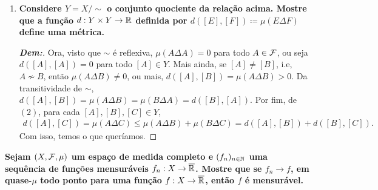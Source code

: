 \begin{enumerate}[label=(\alph*), wide, labelindent=0pt]
\begin{proof}[\textbf{Dem:}]
      \noindent 
      (Transitiva:) Sejam $A, B, C \in \mcal F$, vejamos que se $A\sim B$ e $B \sim C$, então $A \sim C$, ou seja,  
      $\mu (A\Delta C) = 0$. Note que, 
      \begin{align*}
        A\Delta C &= (A\cap C^C) \cup (C \cap A^C) = (A \cap C^C\cap(B \cup B^C)) \cup (C \cap A^C\cap(B \cup B^C))\\
        &=((A\cap C^C\cap B) \cup (A \cap C^C \cap B^C)) \cup ((C\cap A^C \cap B)\cup (C\cap A^C \cap B^C))\\
        &=((A\cap(B \setminus C))\cup(C^C\cap(A\setminus B)))\cup((C\cap(B\setminus A))\cup (A^C \cap (C \setminus B)))\\
        &\subseteq ((B\setminus C)\cup (A\setminus B))\cup ((B\setminus A) \cup (C\setminus B)) = (A\Delta B) \cup (B \Delta C).
      \end{align*}    
      Portanto, $\mu(A\Delta C) \le \mu((A\Delta B) \cup (B\Delta C)) $, $(2)$, ou seja 
      \begin{align*}
        0 \le \mu(A\Delta C) \le \mu((A\Delta B) \cup (B\Delta C)) \le \mu(A\Delta B) + \mu(B \Delta C) = 0 + 0 = 0,
      \end{align*}
      ou seja $\mu(A \Delta C) = 0$, isto é, $A \sim C$, como queríamos.
    \end{proof}
  \item \textbf{Considere $Y = X/\sim $ o conjunto quociente da 
    relação acima. Mostre que a função 
    $d: Y \times Y \rightarrow \mathbb R$ definida por 
    $d([E], [F])\coloneq \mu(E \Delta F)$ define uma métrica.}
    \begin{proof}[\textbf{Dem:}]
      Ora, visto que $\sim$ é reflexiva, $\mu(A \Delta A) = 0$ para todo $A \in \mathcal F$, ou seja $d([A], [A]) = 0$ para
      todo $[A] \in Y$. Mais ainda, se $[A] \neq [B]$, i.e, $A \not \sim B$, então $\mu(A\Delta B)\neq 0$, ou mais, 
      $d([A], [B]) = \mu(A \Delta B) > 0$. Da transitividade de $\sim$, $d([A], [B]) = \mu(A \Delta B) = 
      \mu(B \Delta A) = d([B], [A])$. Por fim,  de $(2)$, para cada $[A], [B], [C] \in Y$, 
      \begin{align*}
        d([A], [C]) = \mu(A \Delta C) \le \mu(A \Delta B) + \mu(B \Delta C) = d([A], [B]) + d([B], [C]).
      \end{align*}
      Com isso, temos o que queríamos.
    \end{proof}
\end{enumerate}
\biglinend
{}
\myexe{\thedois}
\bigline 
\textbf{Sejam $(X, \mathcal F, \mu)$ um espaço de medida completo e $(f_n)_{n \in \mathbb N}$ uma sequência de funções mensuráveis 
$f_n: X \rightarrow \overline {\mathbb R}$. Mostre que se $f_n \rightarrow f$, em quase-$\mu$ todo ponto para uma função 
$f: X \rightarrow \overline {\mathbb R}$, então $f$ é mensurável.}
